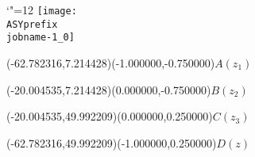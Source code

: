 \setlength{\unitlength}{1pt}%
\makeatletter%
\let\ASYencoding\f@encoding%
\let\ASYfamily\f@family%
\let\ASYseries\f@series%
\let\ASYshape\f@shape%
\makeatother%
{\catcode`"=12%
\texttt{[image: \\ASYprefix\\jobname-1\_0]}%
}%
%
\fontsize{6.000000}{7.200000}\selectfont%
\usefont{\ASYencoding}{\ASYfamily}{\ASYseries}{\ASYshape}%
\ASYalign(-62.782316,7.214428)(-1.000000,-0.750000){$A(z_1)$}%
%
\fontsize{6.000000}{7.200000}\selectfont%
\ASYalign(-20.004535,7.214428)(0.000000,-0.750000){$B(z_2)$}%
%
\fontsize{6.000000}{7.200000}\selectfont%
\ASYalign(-20.004535,49.992209)(0.000000,0.250000){$C(z_3)$}%
%
\fontsize{6.000000}{7.200000}\selectfont%
\ASYalign(-62.782316,49.992209)(-1.000000,0.250000){$D(z)$}%
